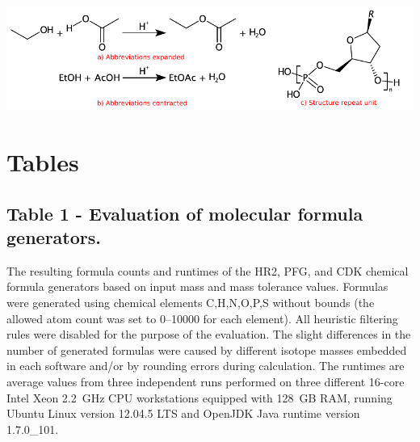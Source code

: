 \documentclass[10pt]{bmcart}
\begin{document}
\begin{backmatter}
\includegraphics[width=\textwidth]{img/sgroups.pdf}


\newpage


\newpage

\section*{Tables}


  \subsection*{Table 1 - Evaluation of molecular formula generators.}
  \label{tab:formula_generators}
  The resulting formula counts and runtimes of the HR2, PFG, and CDK chemical
formula generators based on input mass and mass tolerance values. Formulas were
generated using chemical elements C,H,N,O,P,S without bounds (the allowed atom
count was set to 0--10000 for each element). All heuristic filtering rules were
disabled for the purpose of the evaluation. The slight differences in the
number of generated formulas were caused by different isotope masses embedded
in each software and/or by rounding errors during calculation. The runtimes are
average values from three independent runs performed on three different 16-core
Intel Xeon 2.2~GHz CPU workstations equipped with 128~GB RAM, running Ubuntu
Linux version 12.04.5 LTS and OpenJDK Java runtime version 1.7.0\_101.
  \baselineskip


\end{backmatter}
\end{document}
